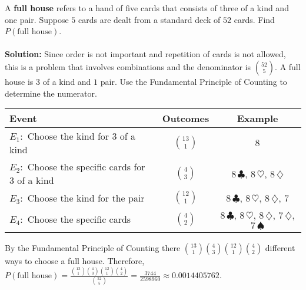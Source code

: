 \documentclass[12pt]{article}%
\newcommand{\FPC}{Fundamental Principle of Counting }
\begin{document}
\noindent A \textbf{full house} refers to a hand of five cards that consists 
of three of a kind and one pair. Suppose $5$ cards are dealt from a standard deck 
of $52$ cards. Find
$P(\mbox{full house})$.\\\\
\textbf{Solution:} Since order is not important and repetition of 
cards is not allowed, this is a problem that involves combinations and
the denominator is $\binom{52}{5}$. A full house is $3$ of a kind and
$1$ pair. Use the \FPC to determine the numerator. 
\begin{center}
\begin{tabular}{lcc}
Event & Outcomes & Example\\
\hline
$E_1:$ Choose the kind for $3$ of a kind & $\binom{13}{1}$ & $8$ \\
$E_2:$ Choose the specific cards for $3$ of a kind & $\binom{4}{3}$ & 
$8\,\clubsuit$, $8\,\heartsuit$, $8\,\diamondsuit$\\
$E_3:$ Choose the kind for the pair & $\binom{12}{1}$ & 
$8\,\clubsuit$, $8\,\heartsuit$, $8\,\diamondsuit$, $7$\\
$E_4:$ Choose the specific cards & $\binom{4}{2}$ & 
$8\,\clubsuit$, $8\,\heartsuit$, $8\,\diamondsuit$, $7\,\diamondsuit$,
$7\,\spadesuit$\\
\end{tabular}
\end{center}
By the \FPC there $\binom{13}{1}\binom{4}{3}\binom{12}{1}\binom{4}{2}$ different
ways to choose a full house. Therefore, $P(\mbox{full house})=\frac{\binom{13}{1}\binom{4}{3}\binom{12}{1}\binom{4}{2}}{\binom{52}{5}}=\frac{3744}{2598960} \approx 0.0014405762$.\\\\
\end{document}

